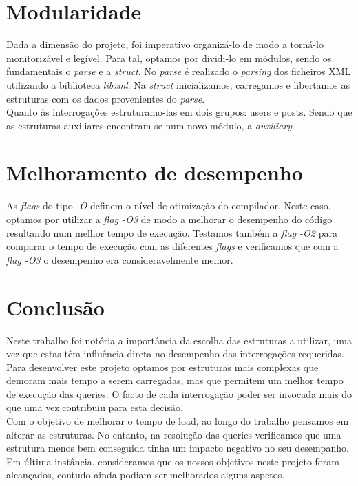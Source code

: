 \documentclass[10pt,a4paper]{article}
\begin{document}
\section{Modularidade}
\label{sec:solucao}
Dada a dimensão do projeto, foi imperativo organizá-lo de modo a torná-lo monitorizável e legível. Para tal, optamos por dividi-lo em módulos, sendo os fundamentais o \textit{parse} e a \textit{struct}. No \textit{parse} é realizado o \textit{parsing} dos ficheiros XML utilizando a biblioteca \textit{libxml}. Na \textit{struct} inicializamos, carregamos e libertamos as estruturas com os dados provenientes do  \textit{parse}.\\
\indent Quanto às interrogações estruturamo-las em dois grupos: users e posts. Sendo que as estruturas auxiliares encontram-se num novo módulo, a \textit{auxiliary}.

\section{Melhoramento de desempenho}
\label{sec:solucao}
As \textit{flags} do tipo \textit{-O} definem o nível de otimização do compilador. Neste caso, optamos por utilizar a \textit{flag -O3} de modo a melhorar o desempenho do código resultando num melhor tempo de execução. Testamos também a \textit{flag -O2} para comparar o tempo de execução com as diferentes \textit{flags} e verificamos que com a \textit{flag -O3} o desempenho era consideravelmente melhor.

\section{Conclusão}
\label{sec:conclusao}
Neste trabalho foi notória a importância da escolha das estruturas a utilizar, uma vez que estas têm influência direta no desempenho das interrogações requeridas. Para desenvolver este projeto optamos por estruturas mais complexas que demoram mais tempo a serem carregadas, mas que permitem um melhor tempo de execução das queries. O facto de cada interrogação poder ser invocada mais do que uma vez contribuiu para esta decisão.\\
\indent Com o objetivo de melhorar o tempo de load, ao longo do trabalho pensamos em alterar as estruturas. No entanto, na resolução das queries verificamos que uma estrutura menos bem conseguida tinha um impacto negativo no seu desempanho.\\
\indent Em última instância, consideramos que os nossos objetivos neste projeto foram alcançados, contudo ainda podiam ser melhorados alguns aspetos.
\end{document}

